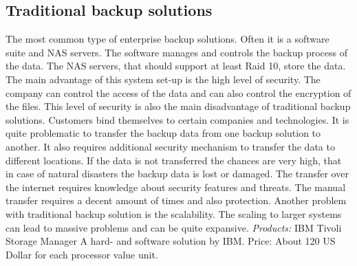 \documentclass[12pt]{article}
\begin{document}
\subsection{Traditional backup solutions}
The most common type of enterprise backup solutions. Often it is a software suite and NAS servers. The software manages and controls the backup process of the data. The NAS servers, that should support at least Raid 10, store the data. The main advantage of this system set-up is the high level of security. The company can control the access of the data and can also control the encryption of the files. This level of security is also the main disadvantage of traditional backup solutions.
\newline
\newline
Customers bind themselves to certain companies and technologies. It is quite problematic to transfer the backup data from one backup solution to another. It also requires additional security mechanism to transfer the data to different locations.  If the data is not transferred the chances are very high, that in case of natural disasters the backup data is lost or damaged. The transfer over the internet requires knowledge about security features and threats. The manual transfer requires a decent amount of times and also protection. Another problem with traditional backup solution is the scalability. The scaling to larger systems can lead to massive problems and can be quite expansive.
\newline
\newline
\emph{Products:}
\newline
IBM Tivoli Storage Manager
A hard- and software solution by IBM.
\newline
\newline
Price: About 120 US Dollar for each processor value unit.
\end{document}
